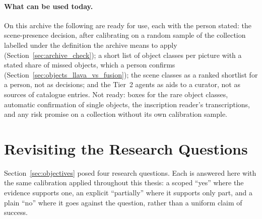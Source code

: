 \documentclass[12pt,a4paper]{report}
\begin{document}
\paragraph{What can be used today.} On this archive the following are ready for use, each with the person stated: the scene-presence decision, after calibrating on a random sample of the collection labelled under the definition the archive means to apply (Section~\ref{sec:archive_check}); a short list of object classes per picture with a stated share of missed objects, which a person confirms (Section~\ref{sec:objects_llava_vs_fusion}); the scene classes as a ranked shortlist for a person, not as decisions; and the Tier~2 agents as aids to a curator, not as sources of catalogue entries. Not ready: boxes for the rare object classes, automatic confirmation of single objects, the inscription reader's transcriptions, and any risk promise on a collection without its own calibration sample.

\section{Revisiting the Research Questions}
Section~\ref{sec:objectives} posed four research questions. Each is answered here with the same calibration applied throughout this thesis: a scoped ``yes'' where the evidence supports one, an explicit ``partially'' where it supports only part, and a plain ``no'' where it goes against the question, rather than a uniform claim of success.
\end{document}
